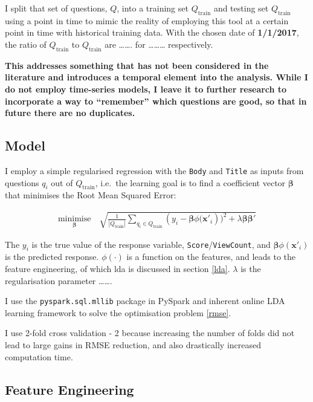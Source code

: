 \documentclass[11pt,preprint, authoryear]{article}
\numberwithin{equation}{section}
\begin{document}
I split that set of questions, \(Q\), into a training set
\(Q_\text{train}\) and testing set \(Q_\text{train}\) using a point in
time to mimic the reality of employing this tool at a certain point in
time with historical training data. With the chosen date of
\textbf{1/1/2017}, the ratio of \(Q_\text{train}\) to \(Q_\text{train}\)
are \ldots{}\ldots{}. for \ldots{}\ldots{}\ldots{} respectively.

\textbf{This addresses something that has not been considered in the
literature and introduces a temporal element into the analysis. While I
do not employ time-series models, I leave it to further research to
incorporate a way to ``remember'' which questions are good, so that in
future there are no duplicates.}

\subsection{\texorpdfstring{Model \label{Model}}{Model }}\label{model}

I employ a simple regularised regression with the \texttt{Body} and
\texttt{Title} as inputs from questions \(q_i\) out of
\(Q_\text{train}\), i.e.~the learning goal is to find a coefficient
vector \(\bm{\beta}\) that minimises the Root Mean Squared Error:

\begin{align} \label{rmse}
\underset{\bm{\beta}}{\text{minimise}} \quad \sqrt{ \frac{1}{|Q_\text{train}|} \sum_{ q_{i} \in Q_{\text{train}} } ( y_i - {\bm{\beta}\phi(\bm{x'}_i}) )^2 + \lambda \bm{\beta}\bm{\beta'} }
\end{align}

The \(y_i\) is the true value of the response variable,
\texttt{Score}/\texttt{ViewCount}, and \(\bm{\beta}\phi(\bm{x'}_i)\) is
the predicted response. \(\phi(\cdot)\) is a function on the features,
and leads to the feature engineering, of which lda is discussed in
section \ref{lda}. \(\lambda\) is the regularisation parameter
\ldots{}\ldots{}.

I use the \texttt{pyspark.sql.mllib} package in PySpark and inherent
online LDA learning framework to solve the optimisation problem
\ref{rmse}.

I use 2-fold cross validation - 2 because increasing the number of folds
did not lead to large gains in RMSE reduction, and also drastically
increased computation time.

\subsection{Feature Engineering}\label{feature-engineering}
\end{document}
